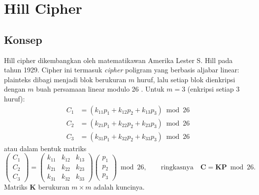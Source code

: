 ﻿\section{Hill Cipher}
\label{sec:hill}

\subsection{Konsep}

Hill cipher dikembangkan oleh matematikawan Amerika Lester S. Hill pada tahun 1929. Cipher ini termasuk \textit{cipher} poligram yang berbasis aljabar linear: plainteks dibagi menjadi blok berukuran $m$ huruf, lalu setiap blok dienkripsi dengan $m$ buah persamaan linear modulo 26 \cite{munir_slides_itb,stallings2017}. Untuk $m = 3$ (enkripsi setiap 3 huruf):
\begin{align*}
C_1 &= (k_{11} p_1 + k_{12} p_2 + k_{13} p_3) \bmod 26 \\
C_2 &= (k_{21} p_1 + k_{22} p_2 + k_{23} p_3) \bmod 26 \\
C_3 &= (k_{31} p_1 + k_{32} p_2 + k_{33} p_3) \bmod 26
\end{align*}
atau dalam bentuk matriks
\[
\begin{pmatrix} C_1 \\ C_2 \\ C_3 \end{pmatrix} =
\begin{pmatrix} k_{11} & k_{12} & k_{13} \\ k_{21} & k_{22} & k_{23} \\ k_{31} & k_{32} & k_{33} \end{pmatrix}
\begin{pmatrix} p_1 \\ p_2 \\ p_3 \end{pmatrix} \bmod 26,
\qquad \text{ringkasnya} \quad \mathbf{C} = \mathbf{K}\mathbf{P} \bmod 26.
\]
Matriks $\mathbf{K}$ berukuran $m \times m$ adalah kuncinya.

